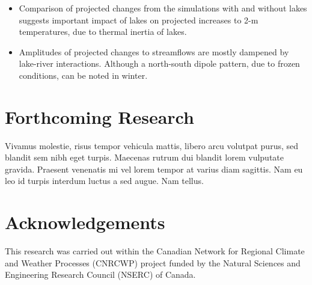 \documentclass[a0,landscape]{a0poster}
\begin{document}
\begin{multicols*}{3}
\begin{itemize}
\item Comparison of projected changes from the simulations with and without lakes suggests important impact of lakes on projected increases to 2-m temperatures, due to thermal inertia of lakes.
\item Amplitudes of projected changes to streamflows are mostly dampened by lake-river interactions. Although a north-south dipole pattern, due to frozen conditions, can be noted in winter.
\end{itemize}

\color{DarkSlateGray} %


\section*{Forthcoming Research}

Vivamus molestie, risus tempor vehicula mattis, libero arcu volutpat purus, sed blandit sem nibh eget turpis. Maecenas rutrum dui blandit lorem vulputate gravida. Praesent venenatis mi vel lorem tempor at varius diam sagittis. Nam eu leo id turpis interdum luctus a sed augue. Nam tellus.


\nocite{*} %


\section*{Acknowledgements}

This research was carried out within the Canadian Network for Regional Climate and Weather Processes (CNRCWP) project funded by the Natural Sciences and Engineering Research Council (NSERC) of Canada.

\end{multicols*}
\end{document}
